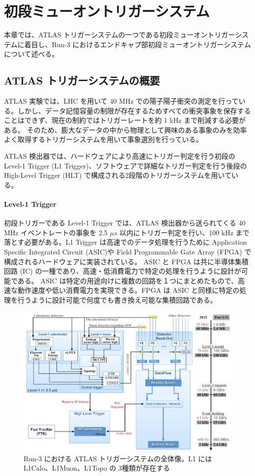 \chapter{初段ミューオントリガーシステム}
本章では、ATLAS トリガーシステムの一つである初段ミューオントリガーシステムに着目し、Run-3 におけるエンドキャプ部初段ミューオントリガーシステムについて述べる。

\section{ATLAS トリガーシステムの概要}
ATLAS 実験では、LHC を用いて 40 MHz での陽子陽子衝突の測定を行っている。しかし、データ記憶容量の制限が存在するためすべての衝突事象を保存することはできず、現在の制約ではトリガーレートを約 1 kHz まで削減する必要がある。
そのため、膨大なデータの中から物理として興味のある事象のみを効率よく取得するトリガーシステムを用いて事象選別を行っている。

ATLAS 検出器では、ハードウェアにより高速にトリガー判定を行う初段の Level-1 Trigger (L1 Trigger)、ソフトウェアで詳細なトリガー判定を行う後段の High-Level Trigger (HLT) で構成される2段階のトリガーシステムを用いている。

\subsubsection{Level-1 Trigger}
初段トリガーである Level-1 Trigger では、ATLAS 検出器から送られてくる 40 MHz イベントレートの事象を 2.5 $\mu s$ 以内にトリガー判定を行い、100 kHz まで落とす必要がある。L1 Trigger は高速でのデータ処理を行うために Application Specific Integrated Circuit (ASIC)や Field Programmable Gate Array (FPGA) で構成されるハードウェアに実装されている。
ASIC と FPGA は共に半導体集積回路 (IC) の一種であり、高速・低消費電力で特定の処理を行うように設計が可能である。
ASIC は特定の用途向けに複数の回路を１つにまとめたもので、高速な動作速度や低い消費電力を実現できる。FPGA は ASIC と同様に特定の処理を行うように設計可能で何度でも書き換え可能な集積回路である。

\begin{figure}[tb]
  \centering
  \includegraphics[clip, width=14cm]{fig/3/trigger-nagare2.pdf}
  \caption{Run-3 における ATLAS トリガーシステムの全体像。L1 には L1Calo、L1Muon、L1Topo の 3種類が存在する}
  \label{fig:トリガーの全体像}
\end{figure}

